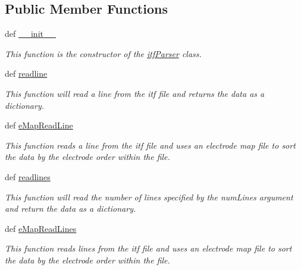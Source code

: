 \subsection*{Public Member Functions}
\begin{DoxyCompactItemize}
\item 
def \hyperlink{class_chassis_8git_1_1itf_parser_1_1itf_parser_a8e9537630ab0367284a49646e39ce7f3}{\-\_\-\-\_\-init\-\_\-\-\_\-}
\begin{DoxyCompactList}\small\item\em This function is the constructor of the \hyperlink{class_chassis_8git_1_1itf_parser_1_1itf_parser}{itf\-Parser} class. \end{DoxyCompactList}\item 
def \hyperlink{class_chassis_8git_1_1itf_parser_1_1itf_parser_a5527ce6be0f2aef18382dff07b28a59d}{readline}
\begin{DoxyCompactList}\small\item\em This function will read a line from the itf file and returns the data as a dictionary. \end{DoxyCompactList}\item 
def \hyperlink{class_chassis_8git_1_1itf_parser_1_1itf_parser_a2e00fa383a8b60fe0b058cf2c9b57f1d}{e\-Map\-Read\-Line}
\begin{DoxyCompactList}\small\item\em This function reads a line from the itf file and uses an electrode map file to sort the data by the electrode order within the file. \end{DoxyCompactList}\item 
def \hyperlink{class_chassis_8git_1_1itf_parser_1_1itf_parser_ac4e1d090df9c4e0d527b94d80a5b1db1}{readlines}
\begin{DoxyCompactList}\small\item\em This function will read the number of lines specified by the num\-Lines argument and return the data as a dictionary. \end{DoxyCompactList}\item 
def \hyperlink{class_chassis_8git_1_1itf_parser_1_1itf_parser_ad09d9277d52d00e8346ca827f0beaf6d}{e\-Map\-Read\-Lines}
\begin{DoxyCompactList}\small\item\em This function reads lines from the itf file and uses an electrode map file to sort the data by the electrode order within the file. \end{DoxyCompactList}\item 

\end{DoxyCompactItemize}
